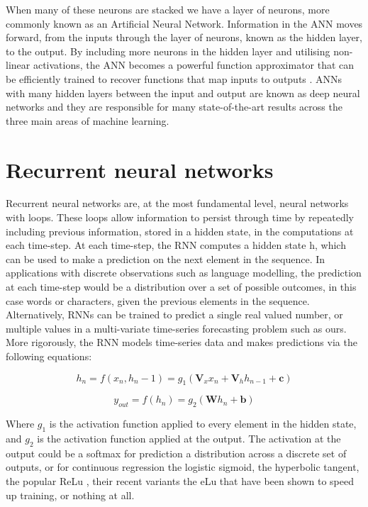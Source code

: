  When many of these neurons are stacked we have a layer of neurons, more commonly known as an Artificial Neural Network. Information in the ANN moves forward, from the inputs through the layer of neurons, known as the hidden layer, to the output. By including more neurons in the hidden layer and utilising non-linear activations, the ANN becomes a powerful function approximator that can be efficiently trained to recover functions that map inputs to outputs \cite{murphy2012machine}. ANNs with many hidden layers between the input and output are known as deep neural networks and they are responsible for many state-of-the-art results across the three main areas of machine learning.

 \section{Recurrent neural networks}
 Recurrent neural networks are, at the most fundamental level, neural networks with loops. These loops allow information to persist through time by repeatedly including previous information, stored in a hidden state, in the computations at each time-step. At each time-step, the RNN computes a hidden state h, which can be used to make a prediction on the next element in the sequence. In applications with discrete observations such as language modelling, the prediction at each time-step would be a distribution over a set of possible outcomes, in this case words or characters, given the previous elements in the sequence. Alternatively, RNNs can be trained to predict a single real valued number, or multiple values in a multi-variate time-series forecasting problem such as ours. More rigorously, the RNN models time-series data and makes predictions via the following equations:

 \begin{equation}
     h_n = f(x_n, h_n-1) = g_1(\mathbf{V}_xx_n + \mathbf{V}_hh_{n-1} + \mathbf{c})
 \end{equation}

 \begin{equation}
     y_{out} = f(h_n) = g_2(\mathbf{W}h_n + \mathbf{b})
 \end{equation}

 Where $g_1$ is the activation function applied to every element in the hidden state, and $g_2$ is the activation function applied at the output. The activation at the output could be a softmax for prediction a distribution across a discrete set of outputs, or for continuous regression the logistic sigmoid, the hyperbolic tangent, the popular ReLu \citep{nair2010rectified}, their recent variants the eLu \citep{clevert2015fast} that have been shown to speed up training, or nothing at all. \\

